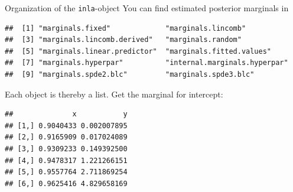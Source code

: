 \documentclass[
  ignorenonframetext,
]{beamer}
\newenvironment{Shaded}{\begin{snugshade}}{\end{snugshade}}
\newcommand{\DecValTok}[1]{\textcolor[rgb]{0.00,0.00,0.81}{#1}}
\newcommand{\FunctionTok}[1]{\textcolor[rgb]{0.00,0.00,0.00}{#1}}
\newcommand{\NormalTok}[1]{#1}
\newcommand{\SpecialCharTok}[1]{\textcolor[rgb]{0.00,0.00,0.00}{#1}}
\begin{document}
\begin{frame}[fragile]{Organization of the \texttt{inla}-object}
\protect\hypertarget{organization-of-the-inla-object-2}{}
You can find estimated posterior marginals in \small

\begin{verbatim}
##  [1] "marginals.fixed"             "marginals.lincomb"          
##  [3] "marginals.lincomb.derived"   "marginals.random"           
##  [5] "marginals.linear.predictor"  "marginals.fitted.values"    
##  [7] "marginals.hyperpar"          "internal.marginals.hyperpar"
##  [9] "marginals.spde2.blc"         "marginals.spde3.blc"
\end{verbatim}

\normalsize

Each object is thereby a list. Get the marginal for intercept:

\scriptsize

\begin{Shaded}
\end{Shaded}

\begin{verbatim}
##              x           y
## [1,] 0.9040433 0.002007895
## [2,] 0.9165909 0.017024089
## [3,] 0.9309233 0.149392500
## [4,] 0.9478317 1.221266151
## [5,] 0.9557764 2.711869254
## [6,] 0.9625416 4.829658169
\end{verbatim}

\normalsize
\end{frame}
\end{document}
